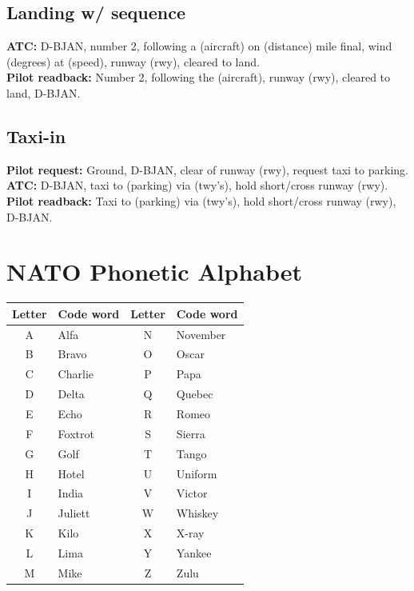 \documentclass{article}
\newcommand{\callsign}{D-BJAN}
\begin{document}
\subsection*{Landing w/ sequence}

\textbf{ATC:} \callsign, number 2, following a (aircraft) on (distance) mile final, wind (degrees) at (speed), runway (rwy), cleared to land. \\

\textbf{Pilot readback:} Number 2, following the (aircraft), runway (rwy), cleared to land, \callsign.

\subsection*{Taxi-in}

\textbf{Pilot request:} Ground, \callsign, clear of runway (rwy), request taxi to parking. \\

\textbf{ATC:} \callsign, taxi to (parking) via (twy’s), hold short/cross runway (rwy). \\

\textbf{Pilot readback:} Taxi to (parking) via (twy’s), hold short/cross runway (rwy), \callsign.

\section{NATO Phonetic Alphabet}

\begin{tabular}{cl|cl}
  \hline
  \textbf{Letter} & \textbf{Code word} &
  \textbf{Letter} & \textbf{Code word} \\
  \hline
  A & Alfa     & N & November \\
  B & Bravo    & O & Oscar    \\
  C & Charlie  & P & Papa     \\
  D & Delta    & Q & Quebec   \\
  E & Echo     & R & Romeo    \\
  F & Foxtrot  & S & Sierra   \\
  G & Golf     & T & Tango    \\
  H & Hotel    & U & Uniform  \\
  I & India    & V & Victor   \\
  J & Juliett  & W & Whiskey  \\
  K & Kilo     & X & X-ray    \\
  L & Lima     & Y & Yankee   \\
  M & Mike     & Z & Zulu     \\
  \hline
\end{tabular}
\end{document}
